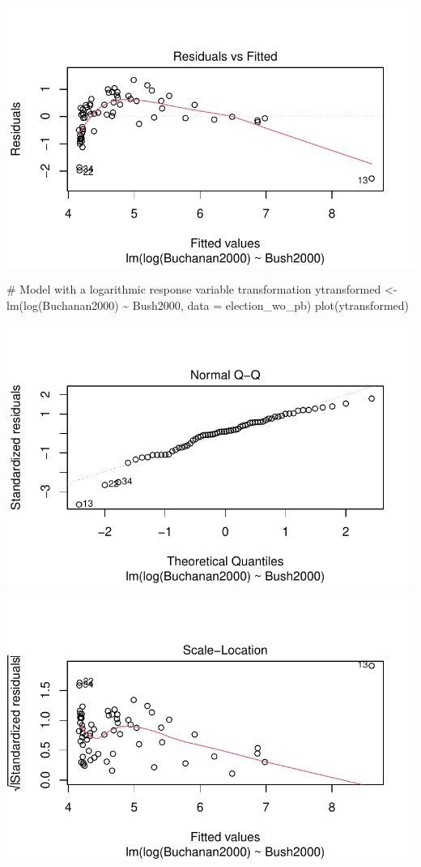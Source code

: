 \documentclass[
  letterpaper,
  DIV=11,
  numbers=noendperiod]{scrartcl}
\newenvironment{Shaded}{\begin{snugshade}}{\end{snugshade}}
\newcommand{\AttributeTok}[1]{\textcolor[rgb]{0.40,0.45,0.13}{#1}}
\newcommand{\CommentTok}[1]{\textcolor[rgb]{0.37,0.37,0.37}{#1}}
\newcommand{\FunctionTok}[1]{\textcolor[rgb]{0.28,0.35,0.67}{#1}}
\newcommand{\NormalTok}[1]{\textcolor[rgb]{0.00,0.23,0.31}{#1}}
\newcommand{\OtherTok}[1]{\textcolor[rgb]{0.00,0.23,0.31}{#1}}
\newcommand{\SpecialCharTok}[1]{\textcolor[rgb]{0.37,0.37,0.37}{#1}}
\begin{document}
\includegraphics{case_study_1_files/figure-pdf/unnamed-chunk-6-10.pdf}

\begin{Shaded}
\begin{Highlighting}[]
\CommentTok{\# Model with a logarithmic response variable transformation}
\NormalTok{ytransformed }\OtherTok{\textless{}{-}} \FunctionTok{lm}\NormalTok{(}\FunctionTok{log}\NormalTok{(Buchanan2000) }\SpecialCharTok{\textasciitilde{}}\NormalTok{ Bush2000, }\AttributeTok{data =}\NormalTok{ election\_wo\_pb)}
\FunctionTok{plot}\NormalTok{(ytransformed)}
\end{Highlighting}
\end{Shaded}

\includegraphics{case_study_1_files/figure-pdf/unnamed-chunk-6-11.pdf}

\includegraphics{case_study_1_files/figure-pdf/unnamed-chunk-6-12.pdf}
\end{document}
